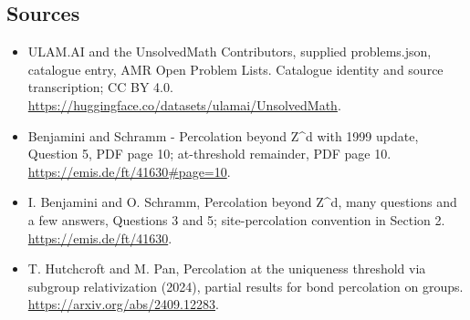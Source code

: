 \documentclass[11pt,a4paper]{article}
\begin{document}
\subsection{Sources}
\begin{itemize}
\item[S1] ULAM.AI and the UnsolvedMath Contributors, supplied problems.json, catalogue entry, AMR Open Problem Lists. Catalogue identity and source transcription; CC BY 4.0.
\url{https://huggingface.co/datasets/ulamai/UnsolvedMath}.
\item[S2] Benjamini and Schramm - Percolation beyond Z\textasciicircum{}d with 1999 update, Question 5, PDF page 10; at-threshold remainder, PDF page 10. 
\url{https://emis.de/ft/41630#page=10}.
\item[S3] I. Benjamini and O. Schramm, Percolation beyond Z\textasciicircum{}d, many questions and a few answers, Questions 3 and 5; site-percolation convention in Section 2.
\url{https://emis.de/ft/41630}.
\item[S4] T. Hutchcroft and M. Pan, Percolation at the uniqueness threshold via subgroup relativization (2024), partial results for bond percolation on groups.
\url{https://arxiv.org/abs/2409.12283}.
\end{itemize}
\end{document}

